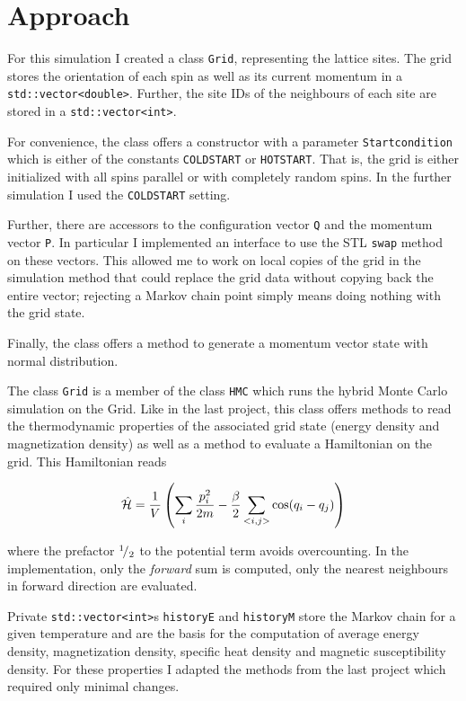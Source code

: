 \chapter{Approach}
For this simulation I created a class \texttt{Grid}, representing the lattice sites. The grid stores the orientation of each spin as well as its current momentum in a \texttt{std::vector<double>}. Further, the site IDs of the neighbours of each site are stored in a \texttt{std::vector<int>}.

For convenience, the class offers a constructor with a parameter \texttt{Startcondition} which is either of the constants \texttt{COLDSTART} or \texttt{HOTSTART}. That is, the grid is either initialized with all spins parallel or with completely random spins. In the further simulation I used the \texttt{COLDSTART} setting.

Further, there are accessors to the configuration vector \texttt{Q} and the momentum vector \texttt{P}. In particular I implemented an interface to use the STL \texttt{swap} method on these vectors. This allowed me to work on local copies of the grid in the simulation method that could replace the grid data without copying back the entire vector; rejecting a Markov chain point simply means doing nothing with the grid state.

Finally, the class offers a method to generate a momentum vector state with normal distribution.

The class \texttt{Grid} is a member of the class \texttt{HMC} which runs the hybrid Monte Carlo simulation on the Grid. Like in the last project, this class offers methods to read the thermodynamic properties of the associated grid state (energy density and magnetization density) as well as a method to evaluate a Hamiltonian on the grid. This Hamiltonian reads

\begin{equation}
	\hat{\mathcal{H}} = \dfrac{1}{V} \left(
		 \sum_{i} \dfrac{p_i^{2}}{2m}
		 -
		 \dfrac{\beta}{2}
		 \sum_{<i, j>} \cos(q_i - q_j)
	\right)
\end{equation}

where the prefactor ${}^ {1} \!/_ {2}$ to the potential term avoids overcounting. In the implementation, only the \emph{forward} sum is computed, \ie only the nearest neighbours in forward direction are evaluated.

Private \texttt{std::vector<int>}s \texttt{historyE} and \texttt{historyM} store the Markov chain for a given temperature and are the basis for the computation of average energy density, magnetization density, specific heat density and magnetic susceptibility density. For these properties I adapted the methods from the last project which required only minimal changes.

